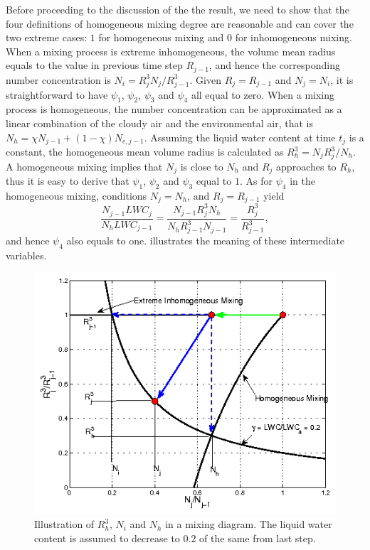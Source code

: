 Before proceeding to the discussion of the the result, we need to show that the 
four definitions of homogeneous mixing degree are reasonable and can cover the 
two extreme cases: $1$ for homogeneous mixing and $0$ for inhomogeneous mixing. 
When a mixing process is extreme inhomogeneous, the volume mean radius equals 
to the value in previous time step $R_{j-1}$, and hence the corresponding number 
concentration is $N_i = R^3_{j}N_j/R^3_{j-1}$. Given $R_j = R_{j-1}$ and 
$N_j = N_i$, it is straightforward to have $\psi_1$, $\psi_2$, $\psi_3$ and $\psi_4$
all equal to zero. When a mixing process is homogeneous, the number concentration can be 
approximated as a linear combination of the cloudy air and the environmental air, that is $N_h = 
\chi N_{j-1} + (1-\chi)N_{e,j-1}$. Assuming the liquid water content at time $t_j$ is a constant, 
the homogeneous mean  volume radius is calculated as $R_h^3 = N_jR_j^3/N_h$. A homogeneous 
mixing implies that $N_j$ is close to $N_h$ and $R_j$ approaches to $R_h$, thus it is 
easy to derive that $\psi_1$, $\psi_2$ and $\psi_3$ equal to $1$. 
As for $\psi_4$ in the homogeneous mixing, conditions $N_j = N_h$, 
and $R_j = R_{j-1}$ yield
\[
\frac{N_{j-1}LWC_j}{N_hLWC_{j-1}} = \frac{N_{j-1}R_j^3N_h}{N_hR_{j-1}^3N_{j-1}}
= \frac{R_j^3}{R_{j-1}^3},
\]
and hence $\psi_4$ also equals to one.  illustrates the meaning of these 
intermediate variables.

\begin{figure}[!htbp]
\includegraphics[width=\textwidth]{Figures/mix_dia}
\caption{Illustration of $R_h^3$, $N_i$ and $N_h$ in a mixing diagram. The liquid water 
content is assumed to decrease to $0.2$ of the same from last step.\label{rn_diagram}}
\end{figure}
 
